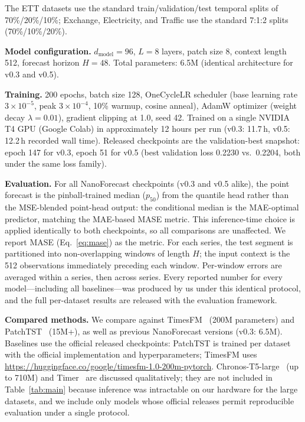 \documentclass[11pt]{article}
\begin{document}
The ETT datasets use the standard train/validation/test temporal splits of 70\%/20\%/10\%; Exchange, Electricity, and Traffic use the standard 7:1:2 splits (70\%/10\%/20\%).

\textbf{Model configuration.} $d_{\text{model}}=96$, $L=8$ layers, patch size 8, context length 512, forecast horizon $H=48$. Total parameters: 6.5M (identical architecture for v0.3 and v0.5).

\textbf{Training.} 200 epochs, batch size 128, OneCycleLR scheduler (base learning rate $3 \times 10^{-5}$, peak $3 \times 10^{-4}$, 10\% warmup, cosine anneal), AdamW optimizer (weight decay $\lambda=0.01$), gradient clipping at 1.0, seed 42. Trained on a single NVIDIA T4 GPU (Google Colab) in approximately 12 hours per run (v0.3: 11.7\,h, v0.5: 12.2\,h recorded wall time). Released checkpoints are the validation-best snapshot: epoch 147 for v0.3, epoch 51 for v0.5 (best validation loss 0.2230 vs.\ 0.2204, both under the same loss family).

\textbf{Evaluation.} For all NanoForecast checkpoints (v0.3 and v0.5 alike), the point forecast is the pinball-trained median ($p_{50}$) from the quantile head rather than the MSE-blended point-head output: the conditional median is the MAE-optimal predictor, matching the MAE-based MASE metric. This inference-time choice is applied identically to both checkpoints, so all comparisons are unaffected. We report MASE (Eq.~\ref{eq:mase}) as the metric. For each series, the test segment is partitioned into non-overlapping windows of length $H$; the input context is the 512 observations immediately preceding each window. Per-window errors are averaged within a series, then across series. Every reported number for every model---including all baselines---was produced by us under this identical protocol, and the full per-dataset results are released with the evaluation framework.

\textbf{Compared methods.} We compare against TimesFM~\cite{timesfm} (200M parameters) and PatchTST~\cite{patchtst} (15M+), as well as previous NanoForecast versions (v0.3: 6.5M). Baselines use the official released checkpoints: PatchTST is trained per dataset with the official implementation and hyperparameters; TimesFM uses \url{https://huggingface.co/google/timesfm-1.0-200m-pytorch}. Chronos-T5-large~\cite{chronos} (up to 710M) and Timer~\cite{timer} are discussed qualitatively; they are not included in Table~\ref{tab:main} because inference was intractable on our hardware for the large datasets, and we include only models whose official releases permit reproducible evaluation under a single protocol.
\end{document}
